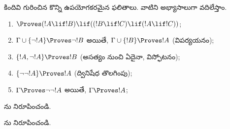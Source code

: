 \documentclass[../../../include/open-logic-section]{subfiles}
\begin{document}
కిందివి  గురించిన కొన్ని ఉపయోగకరమైన ఫలితాలు. వాటిని
అభ్యాసాలుగా వదిలేస్తాం.

\begin{prop}
\begin{enumerate}
\item $\Proves (!A \lif !B) \lif ((!B \lif !C)
  \lif (!A \lif !C))$; 
\item $\Gamma \cup \{ \lnot !A\}
  \Proves \lnot !B$ అయితే, $\Gamma \cup \{ !B\} \Proves
  !A$ (విపర్యయనం); 
\item $\{ !A, \lnot!A\} \Proves
    !B$ (అసత్యం నుంచి ఏదైనా, విస్ఫోటనం); 
\item $\{ \lnot\lnot!A\} \Proves
  !A$ (ద్వినిషేధ తొలగింపు);
\item $\Gamma \Proves \lnot\lnot!A$ అయితే, $\Gamma \Proves
  !A$;
\end{enumerate}
\end{prop}

\begin{prob}
  ను నిరూపించండి.
\end{prob}
\tagendprob

\begin{prob}
  ను నిరూపించండి.
\end{prob}
\tagendprob
\end{document}
